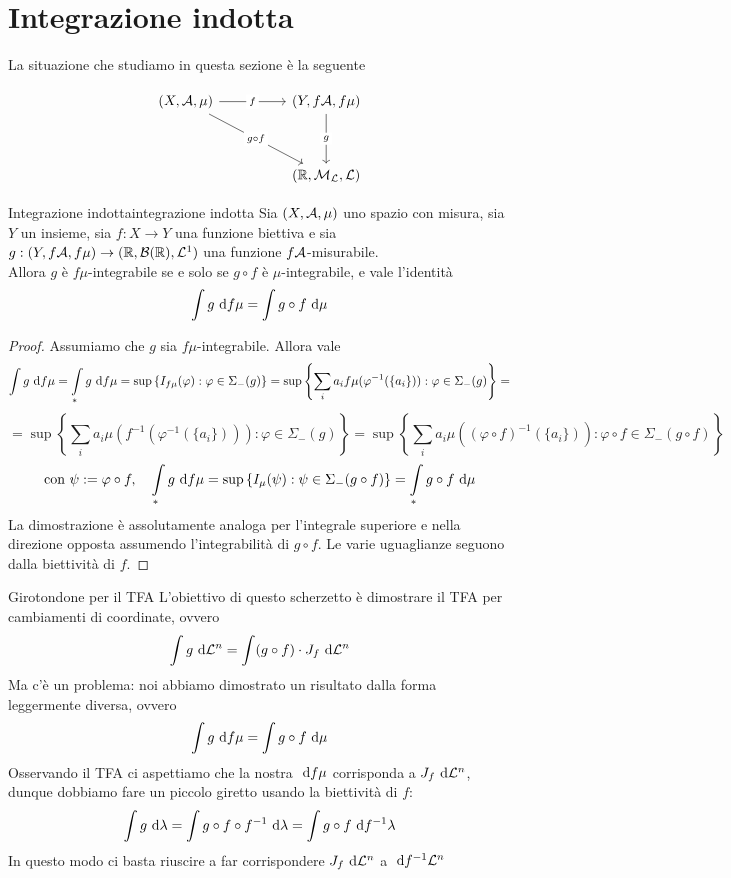 \documentclass{article}
\begin{document}
\section{Integrazione indotta}

La situazione che studiamo in questa sezione è la seguente

\[\begin{tikzcd}
	{(X,\mc{A},\mu)} && {(Y,f\mc{A},f\mu)} \\
	\\
	&& {(\R,\M_\L,\L)}
	\arrow["f"{description}, from=1-1, to=1-3]
	\arrow["{g \circ f}"{description}, from=1-1, to=3-3]
	\arrow["g"{description}, from=1-3, to=3-3]
\end{tikzcd}\]

\begin{theorem}{Integrazione indotta}{integrazione indotta}
    Sia $(X,\mathcal{A},\mu)$ uno spazio con misura, sia $Y$ un insieme, sia $f:X\to Y$ una funzione biettiva e sia $g:(Y,f\mathcal{A},f\mu)\to (\mathbb{R},\mathcal{B}(\mathbb{R}),\mathcal{L}^1)$ una funzione $f\mathcal{A}$-misurabile.\\
    Allora $g$ è $f\mu$-integrabile se e solo se $g\circ f$ è $\mu$-integrabile, e vale l'identità
    \[\int\limits g \text{ d} f\mu = \int\limits g\circ f \text{ d} \mu\]
    \begin{proof}
        Assumiamo che $g$ sia $f\mu$-integrabile. Allora vale
        \[\int\limits g \text{ d} f\mu = \int\limits_* g \text{ d} f\mu = \sup\left\{I_{f\mu}(\varphi) : \varphi \in \Sigma_-(g)\right\}=\sup\left\{ \sum_i a_i f\mu(\varphi^{-1}(\{a_i\})) : \varphi \in \Sigma_-(g) \right\} =\]
        \[ = \sup\left\{ \sum_i a_i \mu(f^{-1}(\varphi^{-1}(\{a_i\}))) : \varphi \in \Sigma_-(g) \right\} = \sup\left\{ \sum_i a_i \mu((\varphi \circ f)^{-1}(\{a_i\})) : \varphi \circ f \in \Sigma_-(g\circ f) \right\}\]
        \[\text{con } \psi := \varphi \circ f, \quad \int\limits_* g \text{ d} f\mu =\sup\left\{ I_\mu(\psi) : \psi \in \Sigma_-(g\circ f) \right\} = \int\limits_* g \circ f \text{ d} \mu\]
        La dimostrazione è assolutamente analoga per l'integrale superiore e nella direzione opposta assumendo l'integrabilità di $g\circ f$. Le varie uguaglianze seguono dalla biettività di $f$.
    \end{proof}
\end{theorem}

\begin{remark}{Girotondone per il TFA}{}
    L'obiettivo di questo scherzetto è dimostrare il TFA per cambiamenti di coordinate, ovvero
    \[\int\limits g \text{ d} \mathcal{L}^n = \int\limits (g \circ f)\cdot J_f \text{ d} \mathcal{L}^n  \]
    Ma c'è un problema: noi abbiamo dimostrato un risultato dalla forma leggermente diversa, ovvero 
    \[\int\limits g \text{ d} f\mu = \int\limits g\circ f \text{ d} \mu \]
    Osservando il TFA ci aspettiamo che la nostra $\text{ d} f\mu$ corrisponda a $J_f \text{ d} \mathcal{L}^n$, dunque dobbiamo fare un piccolo giretto usando la biettività di $f$:
    \[\int\limits g \text{ d} \lambda = \int\limits g \circ f \circ f^{-1} \text{ d} \lambda = \int\limits g \circ f \text{ d} f^{-1}\lambda\]
    In questo modo ci basta riuscire a far corrispondere $J_f \text{ d} \mathcal{L}^n$ a $\text{ d} f^{-1} \mathcal{L}^n$
\end{remark}
\end{document}
